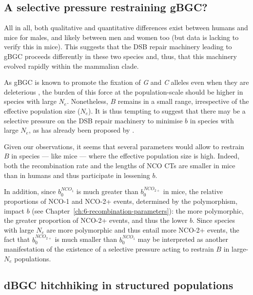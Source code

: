 \subsection{A selective pressure restraining gBGC?}

All in all, both qualitative and quantitative differences exist between humans and mice for males, and likely between men and women too (but data is lacking to verify this in mice).
This suggests that the DSB repair machinery leading to gBGC proceeds differently in these two species and, thus, that this machinery evolved rapidly within the mammalian clade.

As gBGC is known to promote the fixation of \textit{G} and \textit{C} alleles even when they are deleterious \citep{galtier2009gcbiased, necsulea2011meiotic}, the burden of this force at the population-scale should be higher in species with large $N_e$. Nonetheless, $B$ remains in a small range, irrespective of the effective population size ($N_e$). It is thus tempting to suggest that there may be a selective pressure on the DSB repair machinery to minimise $b$ in species with large $N_e$, as has already been proposed by \citet{galtier2018codon}.

Given our observations, it seems that several parameters would allow to restrain $B$ in species — like mice — where the effective population size is high.
Indeed, both the recombination rate and the lengths of NCO CTs are smaller in mice than in humans and thus participate in lessening $b$.

In addition, since $b_0^{NCO_1}$ is much greater than $b_0^{NCO_{2+}}$ in mice, the relative proportions of NCO-1 and NCO-2+ events, determined by the polymorphism, impact $b$ (see Chapter~\ref{ch:6-recombination-parameters}): the more polymorphic, the greater proportion of NCO-2+ events, and thus the lower $b$. Since species with large $N_e$ are more polymorphic and thus entail more NCO-2+ events, the fact that $b_0^{NCO_{2+}}$ is much smaller than $b_0^{NCO_1}$ may be interpreted as another manifestation of the existence of a selective pressure acting to restrain $B$ in large-$N_e$ populations.




\subsection{dBGC hitchhiking in structured populations}

